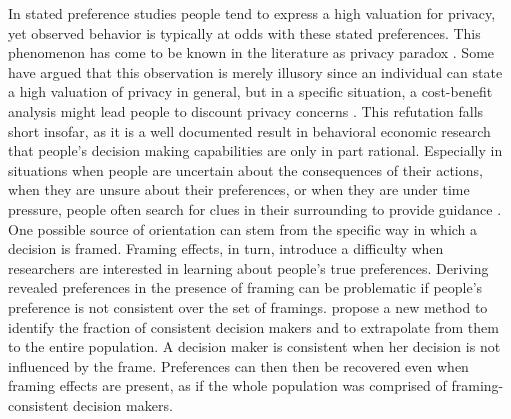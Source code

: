 

In stated preference studies people tend to express a high valuation for privacy, yet observed behavior is typically at odds with these stated preferences.
This phenomenon has come to be known in the literature as privacy paradox \parencite{gerber2018}. Some have argued that this observation is 
merely illusory since an individual can state a high valuation of privacy in general, but in a specific situation, a cost-benefit analysis might 
lead people to discount privacy concerns \parencite[p. 2]{acquisti2015privacy}. This refutation falls short insofar, as it is a well documented result in behavioral
economic research that people's
decision making capabilities are only in part rational. Especially in situations when people are uncertain about the consequences of their actions, when they are unsure about their preferences, or when they 
are under time pressure, people often search for clues in their surrounding to provide guidance \parencite[p. 3]{acquisti2015privacy}. One possible source of 
orientation can stem from the specific way in which a decision is framed. Framing effects, in turn, introduce a difficulty when researchers are interested in learning about people's true preferences.
Deriving revealed preferences in the presence of framing can be problematic if people's preference 
is not consistent over the set of framings. \textcite{goldin2020} propose a new method to identify the fraction of consistent decision makers
and to extrapolate from them to the entire population. A decision maker is consistent when her decision is not influenced by the frame. Preferences can then then be recovered even when framing effects are present, as if the whole population was comprised of framing-consistent decision makers.

